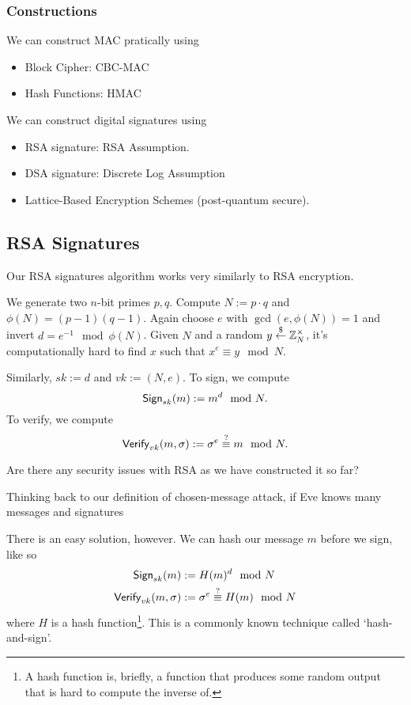\subsubsection{Constructions}
We can construct MAC pratically using
\begin{itemize}
    \item Block Cipher: CBC-MAC
    \item Hash Functions: HMAC
\end{itemize}

We can construct digital signatures using
\begin{itemize}
    \item RSA signature: RSA Assumption.
    \item DSA signature: Discrete Log Assumption
    \item Lattice-Based Encryption Schemes (post-quantum secure).
\end{itemize}

\subsection{RSA Signatures}
Our RSA signatures algorithm works very similarly to RSA encryption.

We generate two $n$-bit primes $p, q$. Compute $N:=p\cdot q$ and $\phi(N) = (p-1)(q-1)$. Again choose $e$ with $\gcd(e, \phi(N)) = 1$ and invert $d = e^{-1}\mod\phi(N)$. Given $N$ and a random $y\overset{\$}{\leftarrow}\mathbb Z_N^\times$, it's computationally hard to find $x$ such that $x^e\equiv y\mod N$.

Similarly, $sk := d$ and $vk := (N, e)$. To sign, we compute
\[\operatorname{\mathsf{Sign}}_{sk}(m) := m^d\mod{N}.\]
To verify, we compute
\[\operatorname{\mathsf{Verify}}_{vk}(m, \sigma):= \sigma^e\overset{?}{\equiv}m\mod N.\]

\begin{ques*}
    Are there any security issues with RSA as we have constructed it so far?
\end{ques*}

Thinking back to our definition of chosen-message attack, if Eve knows many messages and signatures


There is an easy solution, however. We can hash our message $m$ before we sign, like so
\begin{align*}
    \operatorname{\mathsf{Sign}}_{sk}(m)           & := H(m)^d\mod{N}                         \\
    \operatorname{\mathsf{Verify}}_{vk}(m, \sigma) & := \sigma^e\overset{?}{\equiv}H(m)\mod N
\end{align*}
where $H$ is a hash function\footnote{A hash function is, briefly, a function that produces some random output that is hard to compute the inverse of.}. This is a commonly known technique called `hash-and-sign'.

